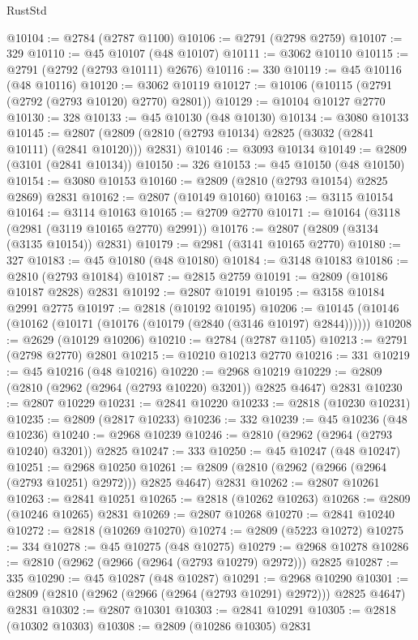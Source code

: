 \begin{lexlean}{RustStd}
\begin{coremodule}
{\begin{coremodule}
{{{{{{{{{{{{{{{{{{{{{{{{{{{{{{{{{@10104 := @2784 (@2787 @1100)
@10106 := @2791 (@2798 @2759)
@10107 := 329
@10110 := @45 @10107 (@48 @10107)
@10111 := @3062 @10110
@10115 := @2791 (@2792 (@2793 @10111) @2676)
@10116 := 330
@10119 := @45 @10116 (@48 @10116)
@10120 := @3062 @10119
@10127 := @10106 (@10115 (@2791 (@2792 (@2793 @10120) @2770) @2801))
@10129 := @10104 @10127 @2770
@10130 := 328
@10133 := @45 @10130 (@48 @10130)
@10134 := @3080 @10133
@10145 := @2807 (@2809 (@2810 (@2793 @10134) @2825 (@3032 (@2841 @10111) (@2841 @10120))) @2831)
@10146 := @3093 @10134
@10149 := @2809 (@3101 (@2841 @10134))
@10150 := 326
@10153 := @45 @10150 (@48 @10150)
@10154 := @3080 @10153
@10160 := @2809 (@2810 (@2793 @10154) @2825 @2869) @2831
@10162 := @2807 (@10149 @10160)
@10163 := @3115 @10154
@10164 := @3114 @10163
@10165 := @2709 @2770
@10171 := @10164 (@3118 (@2981 (@3119 @10165 @2770) @2991))
@10176 := @2807 (@2809 (@3134 (@3135 @10154)) @2831)
@10179 := @2981 (@3141 @10165 @2770)
@10180 := 327
@10183 := @45 @10180 (@48 @10180)
@10184 := @3148 @10183
@10186 := @2810 (@2793 @10184)
@10187 := @2815 @2759
@10191 := @2809 (@10186 @10187 @2828) @2831
@10192 := @2807 @10191
@10195 := @3158 @10184 @2991 @2775
@10197 := @2818 (@10192 @10195)
@10206 := @10145 (@10146 (@10162 (@10171 (@10176 (@10179 (@2840 (@3146 @10197) @2844))))))
@10208 := @2629 (@10129 @10206)
@10210 := @2784 (@2787 @1105)
@10213 := @2791 (@2798 @2770) @2801
@10215 := @10210 @10213 @2770
@10216 := 331
@10219 := @45 @10216 (@48 @10216)
@10220 := @2968 @10219
@10229 := @2809 (@2810 (@2962 (@2964 (@2793 @10220) @3201)) @2825 @4647) @2831
@10230 := @2807 @10229
@10231 := @2841 @10220
@10233 := @2818 (@10230 @10231)
@10235 := @2809 (@2817 @10233)
@10236 := 332
@10239 := @45 @10236 (@48 @10236)
@10240 := @2968 @10239
@10246 := @2810 (@2962 (@2964 (@2793 @10240) @3201)) @2825
@10247 := 333
@10250 := @45 @10247 (@48 @10247)
@10251 := @2968 @10250
@10261 := @2809 (@2810 (@2962 (@2966 (@2964 (@2793 @10251) @2972))) @2825 @4647) @2831
@10262 := @2807 @10261
@10263 := @2841 @10251
@10265 := @2818 (@10262 @10263)
@10268 := @2809 (@10246 @10265) @2831
@10269 := @2807 @10268
@10270 := @2841 @10240
@10272 := @2818 (@10269 @10270)
@10274 := @2809 (@5223 @10272)
@10275 := 334
@10278 := @45 @10275 (@48 @10275)
@10279 := @2968 @10278
@10286 := @2810 (@2962 (@2966 (@2964 (@2793 @10279) @2972))) @2825
@10287 := 335
@10290 := @45 @10287 (@48 @10287)
@10291 := @2968 @10290
@10301 := @2809 (@2810 (@2962 (@2966 (@2964 (@2793 @10291) @2972))) @2825 @4647) @2831
@10302 := @2807 @10301
@10303 := @2841 @10291
@10305 := @2818 (@10302 @10303)
@10308 := @2809 (@10286 @10305) @2831
}}}}}}}}}}}}}}}}}}}}}}}}}}}}}}}}}
\end{coremodule}}
\end{coremodule}
\end{lexlean}
